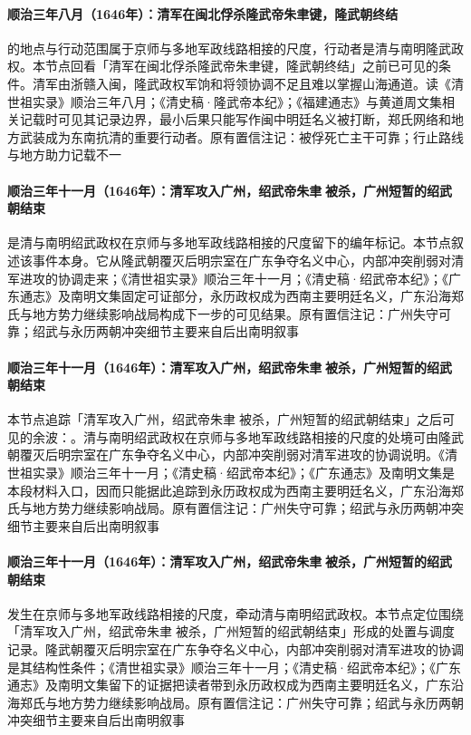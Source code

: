 \paragraph{顺治三年八月（1646年）：清军在闽北俘杀隆武帝朱聿键，隆武朝终结}
 的地点与行动范围属于京师与多地军政线路相接的尺度，行动者是清与南明隆武政权。本节点回看「清军在闽北俘杀隆武帝朱聿键，隆武朝终结」之前已可见的条件。清军由浙赣入闽，隆武政权军饷和将领协调不足且难以掌握山海通道。读《清世祖实录》顺治三年八月；《清史稿·隆武帝本纪》；《福建通志》与黄道周文集相关记载时可见其记录边界，最小后果只能写作闽中明廷名义被打断，郑氏网络和地方武装成为东南抗清的重要行动者。原有置信注记：被俘死亡主干可靠；行止路线与地方助力记载不一

\paragraph{顺治三年十一月（1646年）：清军攻入广州，绍武帝朱聿𨮁被杀，广州短暂的绍武朝结束}
 是清与南明绍武政权在京师与多地军政线路相接的尺度留下的编年标记。本节点叙述该事件本身。它从隆武朝覆灭后明宗室在广东争夺名义中心，内部冲突削弱对清军进攻的协调走来；《清世祖实录》顺治三年十一月；《清史稿·绍武帝本纪》；《广东通志》及南明文集固定可证部分，永历政权成为西南主要明廷名义，广东沿海郑氏与地方势力继续影响战局构成下一步的可见结果。原有置信注记：广州失守可靠；绍武与永历两朝冲突细节主要来自后出南明叙事

\paragraph{顺治三年十一月（1646年）：清军攻入广州，绍武帝朱聿𨮁被杀，广州短暂的绍武朝结束}
本节点追踪「清军攻入广州，绍武帝朱聿𨮁被杀，广州短暂的绍武朝结束」之后可见的余波：。清与南明绍武政权在京师与多地军政线路相接的尺度的处境可由隆武朝覆灭后明宗室在广东争夺名义中心，内部冲突削弱对清军进攻的协调说明。《清世祖实录》顺治三年十一月；《清史稿·绍武帝本纪》；《广东通志》及南明文集是本段材料入口，因而只能据此追踪到永历政权成为西南主要明廷名义，广东沿海郑氏与地方势力继续影响战局。原有置信注记：广州失守可靠；绍武与永历两朝冲突细节主要来自后出南明叙事

\paragraph{顺治三年十一月（1646年）：清军攻入广州，绍武帝朱聿𨮁被杀，广州短暂的绍武朝结束}
 发生在京师与多地军政线路相接的尺度，牵动清与南明绍武政权。本节点定位围绕「清军攻入广州，绍武帝朱聿𨮁被杀，广州短暂的绍武朝结束」形成的处置与调度记录。隆武朝覆灭后明宗室在广东争夺名义中心，内部冲突削弱对清军进攻的协调是其结构性条件；《清世祖实录》顺治三年十一月；《清史稿·绍武帝本纪》；《广东通志》及南明文集留下的证据把读者带到永历政权成为西南主要明廷名义，广东沿海郑氏与地方势力继续影响战局。原有置信注记：广州失守可靠；绍武与永历两朝冲突细节主要来自后出南明叙事

